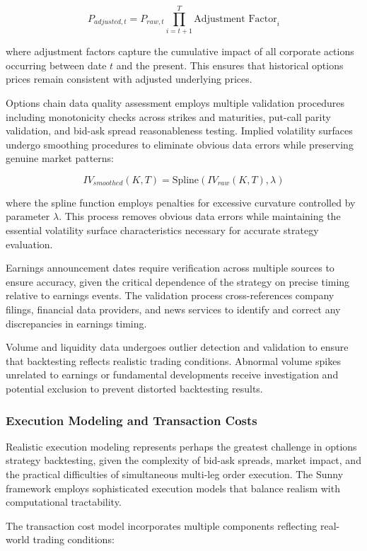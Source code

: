 \documentclass[
  american,
  11pt,
  11pt,
  letterpaper,
  onecolumn]{article}
\begin{document}
\[P_{adjusted,t} = P_{raw,t} \prod_{i=t+1}^{T} \text{Adjustment Factor}_i\]

where adjustment factors capture the cumulative impact of all corporate
actions occurring between date \(t\) and the present. This ensures that
historical options prices remain consistent with adjusted underlying
prices.

Options chain data quality assessment employs multiple validation
procedures including monotonicity checks across strikes and maturities,
put-call parity validation, and bid-ask spread reasonableness testing.
Implied volatility surfaces undergo smoothing procedures to eliminate
obvious data errors while preserving genuine market patterns:

\[IV_{smoothed}(K,T) = \text{Spline}(IV_{raw}(K,T), \lambda)\]

where the spline function employs penalties for excessive curvature
controlled by parameter \(\lambda\). This process removes obvious data
errors while maintaining the essential volatility surface
characteristics necessary for accurate strategy evaluation.

Earnings announcement dates require verification across multiple sources
to ensure accuracy, given the critical dependence of the strategy on
precise timing relative to earnings events. The validation process
cross-references company filings, financial data providers, and news
services to identify and correct any discrepancies in earnings timing.

Volume and liquidity data undergoes outlier detection and validation to
ensure that backtesting reflects realistic trading conditions. Abnormal
volume spikes unrelated to earnings or fundamental developments receive
investigation and potential exclusion to prevent distorted backtesting
results.

\subsubsection{Execution Modeling and Transaction
Costs}\label{execution-modeling-and-transaction-costs}

Realistic execution modeling represents perhaps the greatest challenge
in options strategy backtesting, given the complexity of bid-ask
spreads, market impact, and the practical difficulties of simultaneous
multi-leg order execution. The Sunny framework employs sophisticated
execution models that balance realism with computational tractability.

The transaction cost model incorporates multiple components reflecting
real-world trading conditions:
\end{document}
